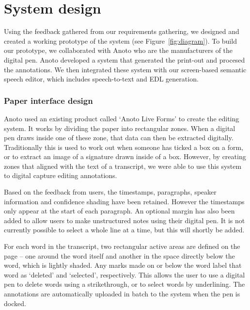 \section{System design}\label{sec:paper-design}
Using the feedback gathered from our requirements gathering, we designed and created a working prototype of the system
(see Figure~\ref{fig:diagram}). To build our prototype, we collaborated with Anoto who are the manufacturers of the
digital pen. Anoto developed a system that generated the print-out and procesed the annotations. We then integrated
these system with our screen-based semantic speech editor, which includes speech-to-text and EDL generation.

\subsubsection{Paper interface design}

Anoto used an existing product called `Anoto Live Forms' to create the editing system. It works by dividing the paper
into rectangular zones. When a digital pen draws inside one of these zone, that data can then be extracted digitally.
Traditionally this is used to work out when someone has ticked a box on a form, or to extract an image of a signature
drawn inside of a box. However, by creating zones that aligned with the text of a transcript, we were able to use this
system to digital capture editing annotations.

Based on the feedback from users, the timestamps, paragraphs, speaker information and confidence shading have been
retained. However the timestamps only appear at the start of each paragraph. An optional margin has also been added to
allow users to make unstructured notes using their digital pen.  It is not currently possible to select a whole line at
a time, but this will shortly be added.

For each word in the transcript, two rectangular active areas are defined on the page -- one around the word itself and
another in the space directly below the word, which is lightly shaded. Any marks made on or below the word label that
word as `deleted' and `selected', respectively. This allows the user to use a digital pen to delete words using a
strikethrough, or to select words by underlining.  The annotations are automatically uploaded in batch to the system
when the pen is docked.


